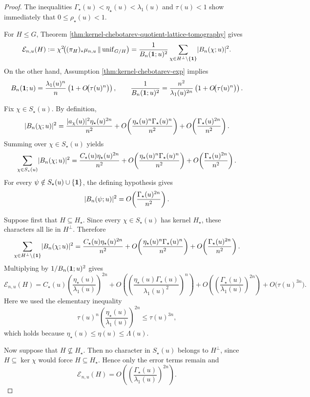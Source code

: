\begin{proof}
The inequalities \(\Gamma_\star(u)<\eta_\star(u)<\lambda_1(u)\) and \(\tau(u)<1\) show immediately that \(0\le \rho_\star(u)<1\).

For \(H\le G\), Theorem \ref{thm:kernel-chebotarev-quotient-lattice-tomography} gives
\[
\mathcal E_{n,u}(H)
:=
\chi^2\!\bigl((\pi_H)_\ast\mu_{n,u}\,\|\,\mathrm{unif}_{G/H}\bigr)
=
\frac{1}{B_n(\mathbf{1};u)^2}
\sum_{\chi\in H^\perp\setminus\{\mathbf{1}\}}
\lvert B_n(\chi;u)\rvert^2.
\]
On the other hand, Assumption \ref{thm:kernel-chebotarev-exp} implies
\[
B_n(\mathbf{1};u)
=
\frac{\lambda_1(u)^n}{n}\left(1+O\!\bigl(\tau(u)^n\bigr)\right),
\qquad
\frac{1}{B_n(\mathbf{1};u)^2}
=
\frac{n^2}{\lambda_1(u)^{2n}}\left(1+O\!\bigl(\tau(u)^n\bigr)\right).
\]

Fix \(\chi\in S_\star(u)\). By definition,
\[
\lvert B_n(\chi;u)\rvert^2
=
\frac{\lvert a_\chi(u)\rvert^2\eta_\star(u)^{2n}}{n^2}
+
O\!\left(\frac{\eta_\star(u)^n\Gamma_\star(u)^n}{n^2}\right)
+
O\!\left(\frac{\Gamma_\star(u)^{2n}}{n^2}\right).
\]
Summing over \(\chi\in S_\star(u)\) yields
\[
\sum_{\chi\in S_\star(u)}\lvert B_n(\chi;u)\rvert^2
=
\frac{C_\star(u)\eta_\star(u)^{2n}}{n^2}
+
O\!\left(\frac{\eta_\star(u)^n\Gamma_\star(u)^n}{n^2}\right)
+
O\!\left(\frac{\Gamma_\star(u)^{2n}}{n^2}\right).
\]
For every \(\psi\notin S_\star(u)\cup\{\mathbf{1}\}\), the defining hypothesis gives
\[
\lvert B_n(\psi;u)\rvert^2
=
O\!\left(\frac{\Gamma_\star(u)^{2n}}{n^2}\right).
\]

Suppose first that \(H\subseteq H_\star\). Since every \(\chi\in S_\star(u)\) has kernel \(H_\star\), these characters all lie in \(H^\perp\). Therefore
\[
\sum_{\chi\in H^\perp\setminus\{\mathbf{1}\}}\lvert B_n(\chi;u)\rvert^2
=
\frac{C_\star(u)\eta_\star(u)^{2n}}{n^2}
+
O\!\left(\frac{\eta_\star(u)^n\Gamma_\star(u)^n}{n^2}\right)
+
O\!\left(\frac{\Gamma_\star(u)^{2n}}{n^2}\right).
\]
Multiplying by \(1/B_n(\mathbf{1};u)^2\) gives
\[
\mathcal E_{n,u}(H)
=
C_\star(u)\left(\frac{\eta_\star(u)}{\lambda_1(u)}\right)^{2n}
+
O\!\left(\left(\frac{\eta_\star(u)\Gamma_\star(u)}{\lambda_1(u)^2}\right)^n\right)
+
O\!\left(\left(\frac{\Gamma_\star(u)}{\lambda_1(u)}\right)^{2n}\right)
+
O\!\bigl(\tau(u)^{3n}\bigr).
\]
Here we used the elementary inequality
\[
\tau(u)^n\left(\frac{\eta_\star(u)}{\lambda_1(u)}\right)^{2n}\le \tau(u)^{3n},
\]
which holds because \(\eta_\star(u)\le \eta(u)\le \Lambda(u)\).

Now suppose that \(H\not\subseteq H_\star\). Then no character in \(S_\star(u)\) belongs to \(H^\perp\), since \(H\subseteq\ker\chi\) would force \(H\subseteq H_\star\). Hence only the error terms remain and
\[
\mathcal E_{n,u}(H)
=
O\!\left(\left(\frac{\Gamma_\star(u)}{\lambda_1(u)}\right)^{2n}\right).
\]


\end{proof}
